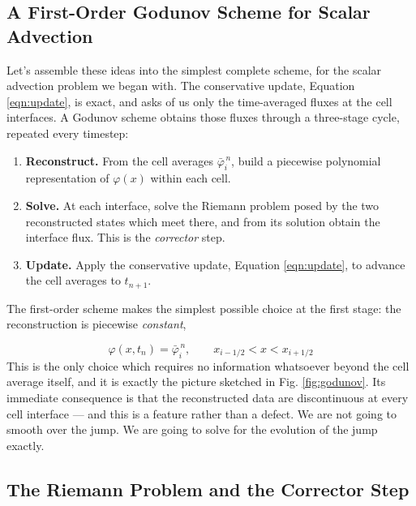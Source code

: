 \documentclass[notoc]{tufte-handout}
\begin{document}
\subsection{A First-Order Godunov Scheme for Scalar Advection}

Let's assemble these ideas into the simplest complete scheme, for the scalar advection problem we began with. The conservative update, Equation \ref{eqn:update}, is exact, and asks of us only the time-averaged fluxes at the cell interfaces. A Godunov scheme obtains those fluxes through a three-stage cycle, repeated every timestep: 

\begin{enumerate}
    \item {\bf Reconstruct.} From the cell averages $\bar{\varphi}_i^{\,n}$, build a piecewise polynomial representation of $\varphi(x)$ within each cell.
    \item {\bf Solve.} At each interface, solve the Riemann problem posed by the two reconstructed states which meet there, and from its solution obtain the interface flux. This is the {\it corrector} step.
    \item {\bf Update.} Apply the conservative update, Equation \ref{eqn:update}, to advance the cell averages to $t_{n+1}$.
\end{enumerate}

The first-order scheme makes the simplest possible choice at the first stage: the reconstruction is piecewise {\it constant},

\begin{equation}
\varphi(x, t_n) = \bar{\varphi}_i^{\,n}, \qquad x_{i-1/2} < x < x_{i+1/2}
\end{equation}
%
This is the only choice which requires no information whatsoever beyond the cell average itself, and it is exactly the picture sketched in Fig. \ref{fig:godunov}. Its immediate consequence is that the reconstructed data are discontinuous at every cell interface --- and this is a feature rather than a defect. We are not going to smooth over the jump. We are going to solve for the evolution of the jump exactly.

\subsection{The Riemann Problem and the Corrector Step}
\end{document}
